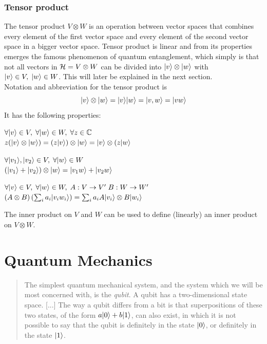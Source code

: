 	\subsubsection*{Tensor product}
	The tensor product $V\otimes W$ is an operation between vector spaces that combines every element of the first vector space and every element of the second vector space in a bigger vector space. Tensor product is linear and from its properties emerges the famous phenomenon of quantum entanglement, which simply is that not all vectors in $\mathcal{H} = V\otimes W$ can be divided into $|v \rangle\otimes|w \rangle$ with $|v \rangle\in V,\; |w \rangle\in W$. This will later be explained in the next section.\\
	Notation and abbreviation for the tensor product is 
	$$ |v \rangle\otimes|w \rangle = |v \rangle|w \rangle = |v,w \rangle = |vw \rangle$$
	It has the following properties:
	\begin{description}
		\item $\forall|v \rangle\in V ,\; \forall|w \rangle\in W, \; \forall z\in \mathbb{C}$	\\
					$ z(|v \rangle\otimes|w \rangle) = (z|v \rangle)\otimes|w \rangle = |v \rangle\otimes(z|w \rangle $
		\item $\forall|v_1 \rangle,|v_2 \rangle\in V ,\; \forall|w \rangle\in W$	\\
					$ (|v_1 \rangle + |v_2 \rangle)\otimes|w \rangle = |v_1w \rangle + |v_2w \rangle $
		\item $\forall|v \rangle\in V ,\; \forall|w \rangle\in W, \; A:V\rightarrow V' \; B:W\rightarrow W'$	\\
					$ (A\otimes B) \left(\sum_i a_i |v_i w_i \rangle \right) = \sum_i a_i A|v_i \rangle\otimes B|w_i \rangle $
	\end{description}
	The inner product on $V$ and $W$ can be used to define (linearly) an inner product on $V\otimes W$.	
	
\section{Quantum Mechanics}
	
	\begin{quotation}
		The simplest quantum mechanical system, and the system which we will be most concerned with, is the \emph{qubit}. A qubit has a two-dimensional state space. [...] 
		The way a qubit differs from a bit is that superpositions of these two states, of the form $a|0 \rangle + b|1 \rangle$, can also exist, in which it is not possible to say that the qubit is definitely in the state $|0 \rangle$, or definitely in the state $|1 \rangle$.
		\cite{NC10}
	\end{quotation}
	
